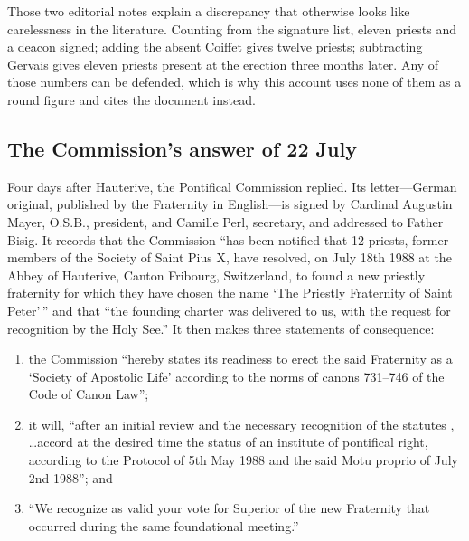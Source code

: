 Those two editorial notes explain a discrepancy that otherwise looks like
carelessness in the literature. Counting from the signature list, eleven
priests and a deacon signed; adding the absent Coiffet gives twelve
priests; subtracting Gervais gives eleven priests present at the erection
three months later. Any of those numbers can be defended, which is why
this account uses none of them as a round figure and cites the document
instead.

\subsection{The Commission's answer of 22 July}

Four days after Hauterive, the Pontifical Commission 
replied. Its letter---German original, published by the Fraternity in
English---is signed by Cardinal Augustin Mayer, O.S.B., president, and
Camille Perl, secretary, and addressed to Father Bisig. It records that
the Commission ``has been notified that 12 priests, former members of
the Society of Saint Pius X, have resolved, on July 18th 1988 at the
Abbey of Hauterive, Canton Fribourg, Switzerland, to found a new priestly
fraternity for which they have chosen the name `The Priestly Fraternity
of Saint Peter'\,'' and that ``the founding charter was delivered to us,
with the request for recognition by the Holy See.'' It then makes three
statements of consequence:

\begin{enumerate}
\item the Commission ``hereby states its readiness to erect the said
Fraternity as a `Society of Apostolic Life' according to the norms of
canons 731--746 of the Code of Canon Law'';
\item it will, ``after an initial review and the necessary recognition of
the statutes , \ldots accord at the desired time
the status of an institute of pontifical right, according to the Protocol
of 5th May 1988 and the said Motu proprio of July 2nd 1988''; and
\item ``We recognize as valid your vote for Superior of the new
Fraternity that occurred during the same foundational meeting.''
\end{enumerate}

